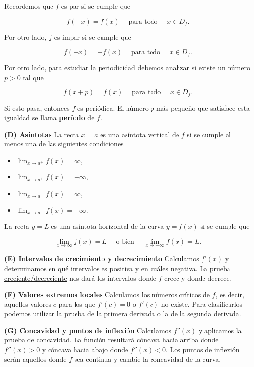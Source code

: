 \documentclass[
  letterpaper,
]{book}
\providecommand{\tightlist}{%
  \setlength{\itemsep}{0pt}\setlength{\parskip}{0pt}}
\theoremstyle{plain}
\theoremstyle{remark}
\begin{document}
Recordemos que \(f\) es par si se cumple que

\[
f(-x)=f(x) \quad \text{ para todo }\quad x\in D_f.
\]

Por otro lado, \(f\) es impar si se cumple que

\[
f(-x)=-f(x) \quad \text{ para todo }\quad x\in D_f.
\]

Por otro lado, para estudiar la periodicidad debemos analizar si existe
un número \(p>0\) tal que

\[
f(x+p)=f(x) \quad \text{ para todo }\quad x\in D_f.
\]

Si esto pasa, entonces \(f\) es periódica. El número \(p\) más pequeño
que satisface esta igualdad se llama \textbf{período} de \(f\).

\textbf{(D) Asíntotas} La recta \(x=a\) es una asíntota vertical de
\(f\) si se cumple al menos una de las siguientes condiciones

\begin{itemize}
\tightlist
\item
  \(\displaystyle \lim_{x\to a^+}f(x)=\infty\),
\item
  \(\displaystyle \lim_{x\to a^+}f(x)=-\infty\),
\end{itemize}

\begin{itemize}
\tightlist
\item
  \(\displaystyle \lim_{x\to a^-}f(x)=\infty\),
\item
  \(\displaystyle \lim_{x\to a^-}f(x)=-\infty\).
\end{itemize}

La recta \(y=L\) es una asíntota horizontal de la curva \(y=f(x)\) si se
cumple que

\[
\lim_{x\to \infty}f(x)=L\quad\text{ o bien }\quad \lim_{x\to -\infty}f(x)=L.
\]

\textbf{(E) Intervalos de crecimiento y decrecimiento} Calculamos
\(f'(x)\) y determinamos en qué intervalos es positiva y en cuáles
negativa. La \hyperref[teo-prueba-cd]{prueba creciente/decreciente} nos
dará los intervalos donde \(f\) crece y donde decrece.

\textbf{(F) Valores extremos locales} Calculamos los números críticos de
\(f\), es decir, aquellos valores \(c\) para los que \(f'(c)=0\) o
\(f'(c)\) no existe. Para clasificarlos podemos utilizar la
\hyperref[teo-prueba-primerader]{prueba de la primera derivada} o la de
la \hyperref[teo-prueba-segundader]{segunda derivada}.

\textbf{(G) Concavidad y puntos de inflexión} Calculamos \(f''(x)\) y
aplicamos la \hyperref[teo-prueba-concavidad]{prueba de concavidad}. La
función resultará cóncava hacia arriba donde \(f''(x)>0\) y cóncava
hacia abajo donde \(f''(x)<0\). Los puntos de inflexión serán aquellos
donde \(f\) sea continua y cambie la concavidad de la curva.
\end{document}
